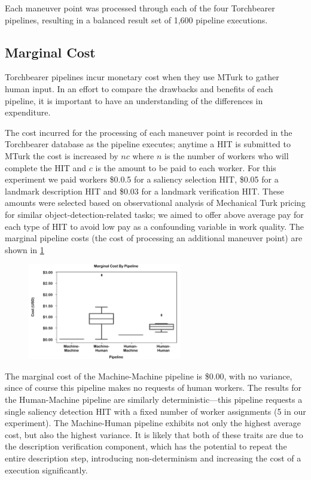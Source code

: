 Each maneuver point was processed through each of the four Torchbearer pipelines, resulting in a balanced result set of 1,600 pipeline executions.

\subsection{Marginal Cost}

Torchbearer pipelines incur monetary cost when they use MTurk to gather human input. In an effort to compare the drawbacks and benefits of each pipeline, it is important to have an understanding of the differences in expenditure.

The cost incurred for the processing of each maneuver point is recorded in the Torchbearer database as the pipeline executes; anytime a HIT is submitted to MTurk the cost is increased by $nc$ where $n$ is the number of workers who will complete the HIT and $c$ is the amount to be paid to each worker. For this experiment we paid workers \$0.0.5 for a saliency selection HIT, \$0.05 for a landmark description HIT and \$0.03 for a landmark verification HIT. These amounts were selected based on observational analysis of Mechanical Turk pricing for similar object-detection-related tasks; we aimed to offer above average pay for each type of HIT to avoid low pay as a confounding variable in work quality. The marginal pipeline costs (the cost of processing an additional maneuver point) are shown in \ref{fig:plot:cost}

\begin{figure}[htbp]
  \centering
  \includegraphics[width=0.6\textwidth]{images/plot_cost.pdf}
  \caption{}
  \label{fig:plot:cost}
\end{figure}

The marginal cost of the Machine-Machine pipeline is \$0.00, with no variance, since of course this pipeline makes no requests of human workers. The results for the Human-Machine pipeline are similarly deterministic---this pipeline requests a single saliency detection HIT with a fixed number of worker assignments (5 in our experiment). The Machine-Human pipeline exhibits not only the highest average cost, but also the highest variance. It is likely that both of these traits are due to the description verification component, which has the potential to repeat the entire description step, introducing non-determinism and increasing the cost of a execution significantly. 

